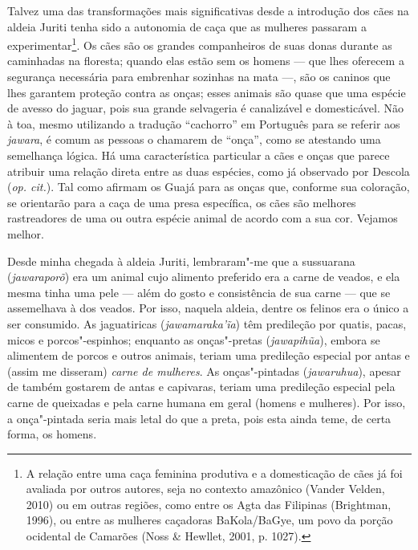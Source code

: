 Talvez uma das transformações mais significativas desde a introdução dos
cães na aldeia Juriti tenha sido a autonomia de caça que as mulheres
passaram a experimentar\footnote{A relação entre uma caça feminina
  produtiva e a domesticação de cães já foi avaliada por outros autores,
  seja no contexto amazônico (Vander Velden, 2010) ou em outras regiões,
  como entre os Agta das Filipinas (Brightman, 1996), ou entre as
  mulheres caçadoras BaKola/BaGye, um povo da porção ocidental de
  Camarões (Noss \& Hewllet, 2001, p. 1027).}. Os cães são os grandes
companheiros de suas donas durante as caminhadas na floresta; quando
elas estão sem os homens --- que lhes oferecem a segurança necessária para
embrenhar sozinhas na mata ---, são os caninos que lhes garantem proteção
contra as onças; esses animais são quase que uma espécie de avesso do
jaguar, pois sua grande selvageria é canalizável e domesticável. Não à
toa, mesmo utilizando a tradução ``cachorro'' em Português para se referir
aos \emph{jawara}, é comum as pessoas o chamarem de ``onça'', como se
atestando uma semelhança lógica. Há uma característica particular a cães
e onças que parece atribuir uma relação direta entre as duas espécies,
como já observado por Descola (\emph{op. cit.}). Tal como afirmam os Guajá para
as onças que, conforme sua coloração, se orientarão para a caça de uma
presa específica, os cães são melhores rastreadores de uma ou outra
espécie animal de acordo com a sua cor. Vejamos melhor.

Desde minha chegada à aldeia Juriti, lembraram"-me que a sussuarana
(\emph{jawaraporõ}) era um animal cujo alimento preferido era a carne de
veados, e ela mesma tinha uma pele --- além do gosto e consistência de sua
carne --- que se assemelhava à dos veados. Por isso, naquela aldeia,
dentre os felinos era o único a ser consumido. As jaguatiricas
(\emph{jawamaraka'ĩa}) têm predileção por quatis, pacas, micos e
porcos"-espinhos; enquanto as onças"-pretas (\emph{jawapihũa}), embora se
alimentem de porcos e outros animais, teriam uma predileção especial por
antas e (assim me disseram) \emph{carne de mulheres}. As onças"-pintadas
(\emph{jawaruhua}), apesar de também gostarem de antas e capivaras,
teriam uma predileção especial pela carne de queixadas e pela carne
humana em geral (homens e mulheres). Por isso, a onça"-pintada seria mais
letal do que a preta, pois esta ainda teme, de certa forma, os homens.

